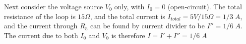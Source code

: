\begin{enumerate}
Next consider the voltage source $V_0$ only, with $I_0=0$ (open-circuit).
The total resistance of the loop is $15\Omega$, and the total current is 
$I_{total}=5V/15\Omega=1/3\;A$, and the current through $R_5$ can be  found
by current divider to be $I''=1/6\;A$. The current due to both $I_0$ and $V_0$
is therefore $I=I'+I''=1/6\;A$ 

\end{enumerate}



